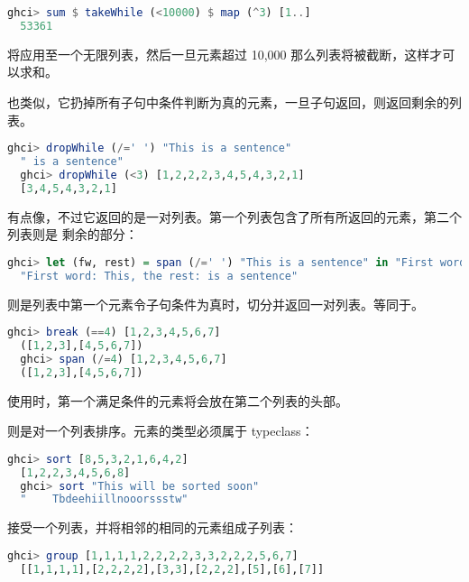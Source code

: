 \documentclass[./main.tex]{subfiles}
\begin{document}
\begin{lstlisting}[language=Haskell]
  ghci> sum $ takeWhile (<10000) $ map (^3) [1..]
  53361
\end{lstlisting}

将应用至一个无限列表，然后一旦元素超过 10,000 那么列表将被截断，这样才可以求和。

也类似，它扔掉所有子句中条件判断为真的元素，一旦子句返回，则返回剩余的列表。

\begin{lstlisting}[language=Haskell]
  ghci> dropWhile (/=' ') "This is a sentence"
  " is a sentence"
  ghci> dropWhile (<3) [1,2,2,2,3,4,5,4,3,2,1]
  [3,4,5,4,3,2,1]
\end{lstlisting}

有点像，不过它返回的是一对列表。第一个列表包含了所有所返回的元素，第二个列表则是
剩余的部分：

\begin{lstlisting}[language=Haskell]
  ghci> let (fw, rest) = span (/=' ') "This is a sentence" in "First word:" ++ fw ++ ", the rest:" ++ rest
  "First word: This, the rest: is a sentence"
\end{lstlisting}

则是列表中第一个元素令子句条件为真时，切分并返回一对列表。等同于。

\begin{lstlisting}[language=Haskell]
  ghci> break (==4) [1,2,3,4,5,6,7]
  ([1,2,3],[4,5,6,7])
  ghci> span (/=4) [1,2,3,4,5,6,7]
  ([1,2,3],[4,5,6,7])
\end{lstlisting}

使用时，第一个满足条件的元素将会放在第二个列表的头部。

则是对一个列表排序。元素的类型必须属于 typeclass：

\begin{lstlisting}[language=Haskell]
  ghci> sort [8,5,3,2,1,6,4,2]
  [1,2,2,3,4,5,6,8]
  ghci> sort "This will be sorted soon"
  "    Tbdeehiillnooorssstw"
\end{lstlisting}

接受一个列表，并将相邻的相同的元素组成子列表：

\begin{lstlisting}[language=Haskell]
  ghci> group [1,1,1,1,2,2,2,2,3,3,2,2,2,5,6,7]
  [[1,1,1,1],[2,2,2,2],[3,3],[2,2,2],[5],[6],[7]]
\end{lstlisting}
\end{document}
